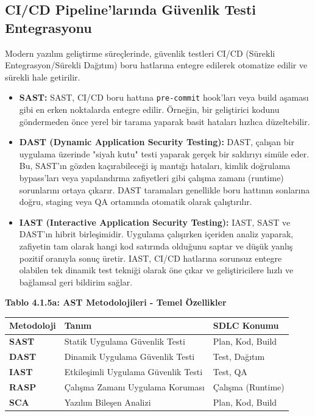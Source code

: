 \subsection{CI/CD Pipeline'larında Güvenlik Testi Entegrasyonu}
Modern yazılım geliştirme süreçlerinde, güvenlik testleri CI/CD (Sürekli Entegrasyon/Sürekli Dağıtım) boru hatlarına entegre edilerek otomatize edilir ve sürekli hale getirilir.
\begin{itemize}
\item \textbf{SAST:} SAST, CI/CD boru hattına \texttt{pre-commit} hook'ları veya build aşaması gibi en erken noktalarda entegre edilir. Örneğin, bir geliştirici kodunu göndermeden önce yerel bir tarama yaparak basit hataları hızlıca düzeltebilir.
\item \textbf{DAST (Dynamic Application Security Testing):} DAST, çalışan bir uygulama üzerinde "siyah kutu" testi yaparak gerçek bir saldırıyı simüle eder. Bu, SAST'ın gözden kaçırabileceği iş mantığı hataları, kimlik doğrulama bypass'ları veya yapılandırma zafiyetleri gibi çalışma zamanı (runtime) sorunlarını ortaya çıkarır. DAST taramaları genellikle boru hattının sonlarına doğru, staging veya QA ortamında otomatik olarak çalıştırılır.
\item \textbf{IAST (Interactive Application Security Testing):} IAST, SAST ve DAST'ın hibrit birleşimidir. Uygulama çalışırken içeriden analiz yaparak, zafiyetin tam olarak hangi kod satırında olduğunu saptar ve düşük yanlış pozitif oranıyla sonuç üretir. IAST, CI/CD hatlarına sorunsuz entegre olabilen tek dinamik test tekniği olarak öne çıkar ve geliştiricilere hızlı ve bağlamsal geri bildirim sağlar.
\end{itemize}
\begin{center}
\textbf{Tablo 4.1.5a: AST Metodolojileri - Temel Özellikler}

\begin{tabular}{|p{4cm}|p{6cm}|p{4cm}|}
\hline
\hline
\textbf{Metodoloji} & \textbf{Tanım} & \textbf{SDLC Konumu}  \\
\hline
\hline
\textbf{SAST} & Statik Uygulama Güvenlik Testi & Plan, Kod, Build  \\
\hline
\hline
\textbf{DAST} & Dinamik Uygulama Güvenlik Testi & Test, Dağıtım  \\
\hline
\hline
\textbf{IAST} & Etkileşimli Uygulama Güvenlik Testi & Test, QA  \\
\hline
\hline
\textbf{RASP} & Çalışma Zamanı Uygulama Koruması & Çalışma (Runtime)  \\
\hline
\hline
\textbf{SCA} & Yazılım Bileşen Analizi & Plan, Kod, Build  \\
\hline
\hline
\hline
\end{tabular}
\end{center}

